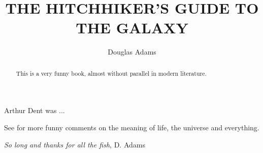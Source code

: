 



\title{THE HITCHHIKER'S GUIDE TO THE GALAXY}
\author{Douglas Adams}
\address{Earth, the Universe}

\date{}


\begin{abstract}
This is a very funny book, almost without parallel in modern
literature.
\end{abstract}

\maketitle

Arthur Dent was ...

See \cite{Adams} for more funny comments on the meaning of life, the
universe and everything.

\begin{thebibliography}{9}
{\it So long and thanks for all the fish},
D. Adams
\end{thebibliography}


%
